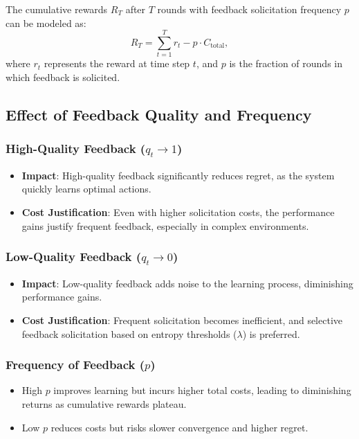 The cumulative rewards \(R_T\) after \(T\) rounds with feedback solicitation frequency \(p\) can be modeled as:
\[
R_T = \sum_{t=1}^T r_t - p \cdot C_{\text{total}},
\]
where \(r_t\) represents the reward at time step \(t\), and \(p\) is the fraction of rounds in which feedback is solicited.

\subsection{Effect of Feedback Quality and Frequency}

\subsubsection{High-Quality Feedback (\(q_t \to 1\))}

\begin{itemize}
    \item \textbf{Impact}: High-quality feedback significantly reduces regret, as the system quickly learns optimal actions.
    \item \textbf{Cost Justification}: Even with higher solicitation costs, the performance gains justify frequent feedback, especially in complex environments.
\end{itemize}

\subsubsection{Low-Quality Feedback (\(q_t \to 0\))}

\begin{itemize}
    \item \textbf{Impact}: Low-quality feedback adds noise to the learning process, diminishing performance gains.
    \item \textbf{Cost Justification}: Frequent solicitation becomes inefficient, and selective feedback solicitation based on entropy thresholds (\(\lambda\)) is preferred.
\end{itemize}

\subsubsection{Frequency of Feedback (\(p\))}

\begin{itemize}
    \item High \(p\) improves learning but incurs higher total costs, leading to diminishing returns as cumulative rewards plateau.
    \item Low \(p\) reduces costs but risks slower convergence and higher regret.
\end{itemize}

